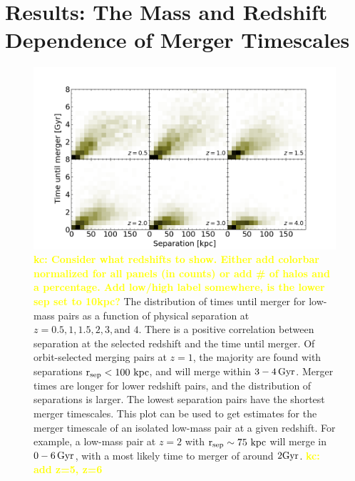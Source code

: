 \documentclass[twocolumn,linenumbers]{aastex631}
\newcommand{\kc}[1]{\textcolor{yellow}{\textbf{kc: #1}} }
\newcommand{\rsep}{\ensuremath{\rm r_{sep}}}
\begin{document}

\section{Results: The Mass and Redshift Dependence of Merger Timescales}
\begin{figure}[htb]
    \begin{center}
    \includegraphics[width=\textwidth]{plots/bet-on-it/3_Timevsseplow-2d.png}
    \caption{\kc{Consider what redshifts to show. Either add colorbar normalized for all panels (in counts) or add \# of halos and a percentage. Add low/high label somewhere, is the lower sep set to 10kpc?} The distribution of times until merger for low-mass pairs as a function of physical separation at $z=0.5,1,1.5,2,3,\mbox{and }4$. 
    There is a positive correlation between separation at the selected redshift and the time until merger. 
    Of orbit-selected merging pairs at $z=1$, the majority are found with separations $\rsep<100\,\kpc$, and will merge within $3-4\, \mathrm{Gyr}$. 
    Merger times are longer for lower redshift pairs, and the distribution of separations is larger.
    The lowest separation pairs have the shortest merger timescales.
    This plot can be used to get estimates for the merger timescale of an isolated low-mass pair at a given redshift. For example, a low-mass pair at $z=2$ with $\rsep\sim 75\,\kpc$ will merge in $0-6\,\mathrm{Gyr}$, with a most likely time to merger of around $2\mathrm{Gyr}$.
    \kc{add z=5, z=6}
    }
    \label{fig:timevssep-low}
    \end{center}
\end{figure}
\end{document}
